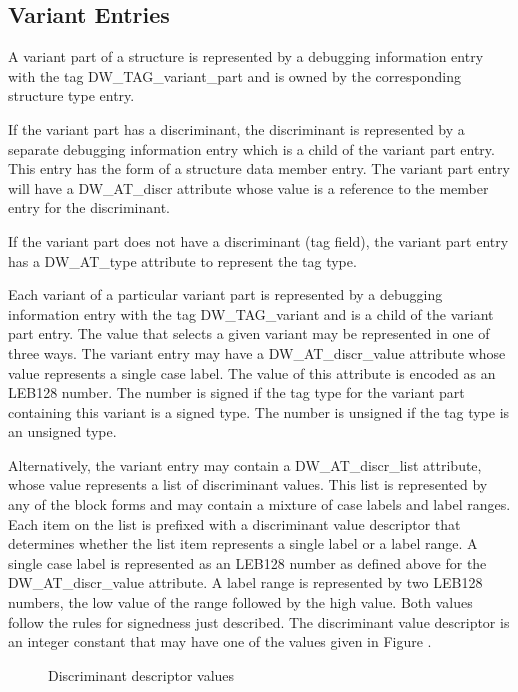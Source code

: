 \subsection{Variant Entries}
\label{chap:variantentries}

A variant part of a structure is represented by a debugging
information entry with the tag DW\_TAG\_variant\_part and is
owned by the corresponding structure type entry.

If the variant part has a discriminant, the discriminant is
represented by a separate debugging information entry which
is a child of the variant part entry. This entry has the form
of a structure data member entry. The variant part entry will
have a DW\_AT\_discr attribute whose value is a reference to
the member entry for the discriminant.

If the variant part does not have a discriminant (tag field),
the variant part entry has a DW\_AT\_type attribute to represent
the tag type.

Each variant of a particular variant part is represented by
a debugging information entry with the tag DW\_TAG\_variant
and is a child of the variant part entry. The value that
selects a given variant may be represented in one of three
ways. The variant entry may have a DW\_AT\_discr\_value attribute
whose value represents a single case label. The value of this
attribute is encoded as an LEB128 number. The number is signed
if the tag type for the variant part containing this variant
is a signed type. The number is unsigned if the tag type is
an unsigned type.

Alternatively, the variant entry may contain a DW\_AT\_discr\_list
attribute, whose value represents a list of discriminant
values. This list is represented by any of the block forms and
may contain a mixture of case labels and label ranges. Each
item on the list is prefixed with a discriminant value
descriptor that determines whether the list item represents
a single label or a label range. A single case label is
represented as an LEB128 number as defined above for the
DW\_AT\_discr\_value attribute. A label range is represented by
two LEB128 numbers, the low value of the range followed by the
high value. Both values follow the rules for signedness just
described. The discriminant value descriptor is an integer
constant that may have one of the values given in 
Figure .

\begin{figure}[here]
\caption{Discriminant descriptor values}\label{fig:discriminantdescriptorvalues}
\end{figure}

